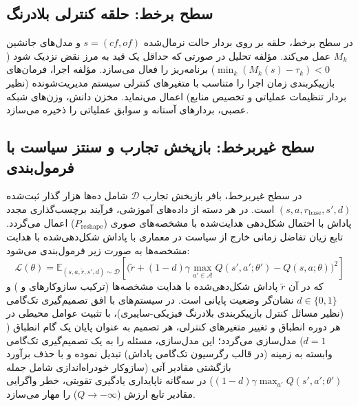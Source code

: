 \documentclass[oneside,openany,phd]{TMU-Thesis}
\begin{document}
\subsection{سطح برخط: حلقه کنترلی بلادرنگ}
\label{subsec:online_surrogate_inference_tier}

در سطح برخط، حلقه  بر روی بردار حالت نرمال‌شده $s = (cf, of)$ و مدل‌های جانشین $M_k$ عمل می‌کند. مؤلفه تحلیل در صورتی که حداقل یک قید به مرز نقض نزدیک شود ($\min_k (M_k(s) - \tau_k) < 0$) برنامه‌ریز را فعال می‌سازد. مؤلفه اجرا، فرمان‌های بازپیکربندی زمان اجرا را متناسب با متغیرهای کنترلی سیستم مدیریت‌شونده (نظیر بردار تنظیمات عملیاتی و تخصیص منابع) اعمال می‌نماید. مخزن دانش، وزن‌های شبکه عصبی، بردارهای آستانه و سوابق عملیاتی را ذخیره می‌سازد.

\subsection{سطح غیربرخط: بازپخش تجارب و سنتز سیاست با فرمول‌بندی }
\label{subsec:offline_td_loss_synthesis_tier}

در سطح غیربرخط، بافر بازپخش تجارب $\mathcal{D}$ شامل ده‌ها هزار گذار ثبت‌شده $(s, a, r_{\text{base}}, s', d)$ است. در هر دسته از داده‌های آموزشی، فرآیند برچسب‌گذاری مجدد پاداش با احتمال شکل‌دهی هدایت‌شده با مشخصه‌های صوری ($P_{\text{reshape}}$) اعمال می‌گردد. تابع زیان تفاضل زمانی خارج از سیاست در معماری \rsdrlplus با پاداش شکل‌دهی‌شده با هدایت مشخصه‌ها به صورت زیر فرمول‌بندی می‌شود:
\begin{equation}
\label{eq:dqn_loss_rsdrlplus}
\mathcal{L}(\theta) = \mathbb{E}_{(s, a, \tilde{r}, s', d) \sim \mathcal{D}} \left[ \Big( \tilde{r} + (1 - d)\gamma \max_{a' \in \mathcal{A}} Q(s', a'; \theta') - Q(s, a; \theta) \Big)^2 \right]
\end{equation}
که در آن $\tilde{r}$ پاداش شکل‌دهی‌شده با هدایت مشخصه‌ها (ترکیب سازوکارهای \mursdrl و \cmrsdrl) و $d \in \{0, 1\}$ نشان‌گر وضعیت پایانی است. در سیستم‌های با افق تصمیم‌گیری تک‌گامی (نظیر مسائل کنترل بازپیکربندی بلادرنگ فیزیکی-سایبری)، با تثبیت عوامل محیطی در هر دوره انطباق و تغییر متغیرهای کنترلی، هر تصمیم به عنوان پایان یک گام انطباق ($d=1$) مدل‌سازی می‌گردد؛ این مدل‌سازی، مسئله را به یک تصمیم‌گیری تک‌گامی وابسته به زمینه (در قالب رگرسیون تک‌گامی پاداش) تبدیل نموده و با حذف برآورد بازگشتی مقادیر آتی (سازوکار خودراه‌اندازی شامل جمله $(1-d)\gamma \max_{a'} Q(s', a'; \theta')$) در سه‌گانه ناپایداری یادگیری تقویتی، خطر واگرایی مقادیر تابع ارزش ($Q \to -\infty$) را مهار می‌سازد.
\end{document}
